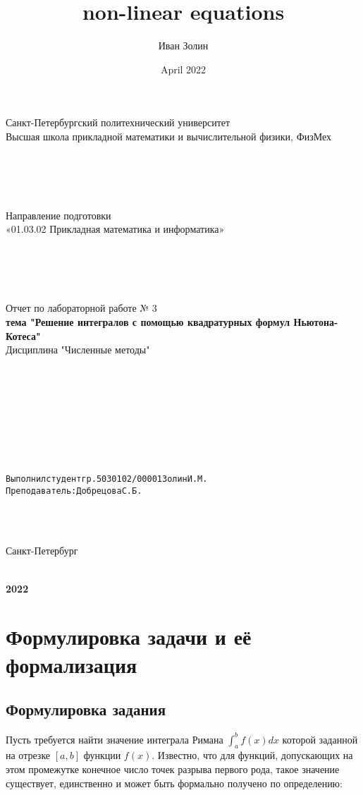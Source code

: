 \documentclass{article}
\title{non-linear equations}
\author{Иван Золин}
\date{April 2022}
\begin{document}
	
	\large
	\begin{center}
		
		Санкт-Петербургский политехнический университет\\
		Высшая школа прикладной математики и вычислительной физики, ФизМех
		
		~\\
		~\\
		~\\
		~\\
		Направление подготовки\\
		«01.03.02 Прикладная математика и информатика»
		
		~\\
		~\\
		~\\
		~\\
		Отчет по лабораторной работе № 3\\
		\textbf{тема "Решение интегралов с помощью квадратурных формул Ньютона-Котеса" }	
		~\\	Дисциплина "Численные методы"
	\end{center}
	
	~\\
	~\\
	~\\
	~\\
	~\\
	~\\
	~\\
	\begin{alltt}
		Выполнил студент гр. 5030102/00001			  		   		  Золин И.М.
		Преподаватель: 				              	        	Добрецова С.Б.
	\end{alltt}
	
	~\\
	~\\
	\begin{center}
		Санкт-Петербург
		
		~\\
		\textbf{2022}
	\end{center}{}
	
	\newpage
	
	\section{Формулировка задачи и её формализация}
	\subsection{Формулировка задания}
	Пусть требуется найти значение интеграла Римана $\int_a^b f(x)dx$ которой заданной на отрезке $[a, b]$ функции $f(x)$. Известно, что для функций, допускающих на этом промежутке конечное число точек разрыва первого рода, такое значение существует, единственно и может быть формально получено по
	определению:
\end{document}
